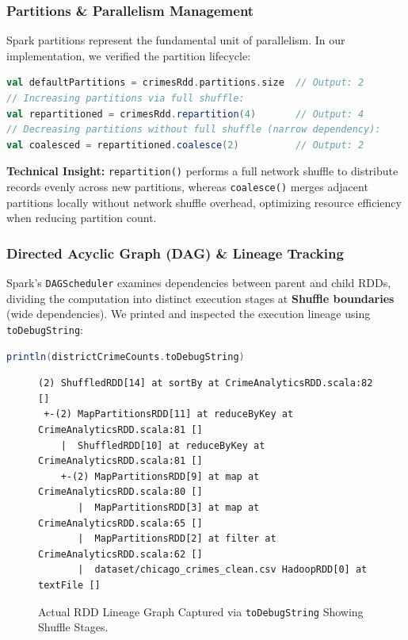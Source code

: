 \documentclass[11pt,a4paper]{article}
\begin{document}
\subsubsection{Partitions \& Parallelism Management}
Spark partitions represent the fundamental unit of parallelism. In our implementation, we verified the partition lifecycle:
\begin{lstlisting}[language=Scala]
val defaultPartitions = crimesRdd.partitions.size  // Output: 2
// Increasing partitions via full shuffle:
val repartitioned = crimesRdd.repartition(4)       // Output: 4
// Decreasing partitions without full shuffle (narrow dependency):
val coalesced = repartitioned.coalesce(2)          // Output: 2
\end{lstlisting}
\textbf{Technical Insight:} \texttt{repartition()} performs a full network shuffle to distribute records evenly across new partitions, whereas \texttt{coalesce()} merges adjacent partitions locally without network shuffle overhead, optimizing resource efficiency when reducing partition count.

\subsubsection{Directed Acyclic Graph (DAG) \& Lineage Tracking}
Spark's \texttt{DAGScheduler} examines dependencies between parent and child RDDs, dividing the computation into distinct execution stages at \textbf{Shuffle boundaries} (wide dependencies). We printed and inspected the execution lineage using \texttt{toDebugString}:
\begin{lstlisting}[language=Scala]
println(districtCrimeCounts.toDebugString)
\end{lstlisting}

\begin{figure}[H]
    \centering
    \small
    \begin{verbatim}
(2) ShuffledRDD[14] at sortBy at CrimeAnalyticsRDD.scala:82 []
 +-(2) MapPartitionsRDD[11] at reduceByKey at CrimeAnalyticsRDD.scala:81 []
    |  ShuffledRDD[10] at reduceByKey at CrimeAnalyticsRDD.scala:81 []
    +-(2) MapPartitionsRDD[9] at map at CrimeAnalyticsRDD.scala:80 []
       |  MapPartitionsRDD[3] at map at CrimeAnalyticsRDD.scala:65 []
       |  MapPartitionsRDD[2] at filter at CrimeAnalyticsRDD.scala:62 []
       |  dataset/chicago_crimes_clean.csv HadoopRDD[0] at textFile []
    \end{verbatim}
    \caption{Actual RDD Lineage Graph Captured via \texttt{toDebugString} Showing Shuffle Stages.}
    \label{fig:lineage_dag}
\end{figure}
\end{document}
